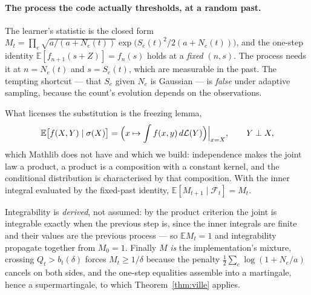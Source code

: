 

\paragraph{The process the code actually thresholds, at a random past.}
The learner's statistic is the closed form
$M_{t}=\prod_{e}\sqrt{a/(a+N_{e}(t))}\exp\bigl(S_{e}(t)^{2}/2(a+N_{e}(t))\bigr)$, and the
one-step identity $\mathbb E[f_{n+1}(s+Z)]=f_{n}(s)$ holds at a \emph{fixed} $(n,s)$. The
process needs it at $n=N_{e}(t)$ and $s=S_{e}(t)$, which are measurable in the past. The
tempting shortcut --- that $S_{e}$ given $N_{e}$ is Gaussian --- is \emph{false} under
adaptive sampling, because the count's evolution depends on the observations.

What licenses the substitution is the freezing lemma,
\[
\mathbb E\bigl[f(X,Y)\mid\sigma(X)\bigr]
=\Bigl(x\mapsto\int f(x,y)\,d\mathcal L(Y)\Bigr)\Big|_{x=X},
\qquad Y\perp X,
\]
which Mathlib does not have and which we build: independence makes the joint law a product, a
product is a composition with a constant kernel, and the conditional distribution is
characterised by that composition. With the inner integral evaluated by the fixed-past
identity, $\mathbb E[M_{t+1}\mid\mathcal F_{t}]=M_{t}$.

Integrability is \emph{derived}, not assumed: by the product criterion the joint is integrable
exactly when the previous step is, since the inner integrals are finite and their values are
the previous process --- so $\mathbb E M_{t}=1$ and integrability propagate together from
$M_{0}=1$. Finally $M$ \emph{is} the implementation's mixture, crossing $Q_{t}>b_{t}(\delta)$
forces $M_{t}\ge1/\delta$ because the penalty $\tfrac12\sum_{e}\log(1+N_{e}/a)$ cancels on
both sides, and the one-step equalities assemble into a martingale, hence a supermartingale,
to which Theorem~\ref{thm:ville} applies.


